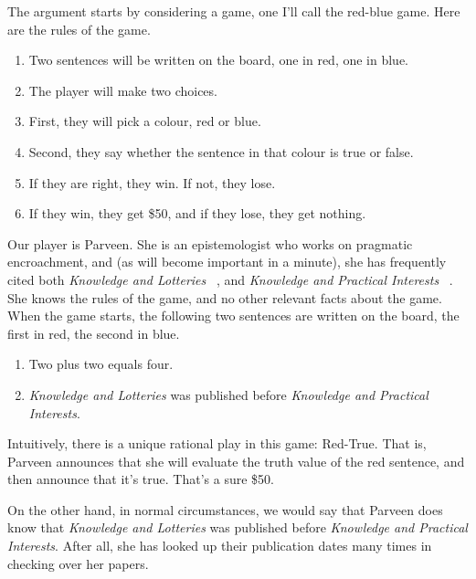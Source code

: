 The argument starts by considering a game, one I'll call the red-blue game. Here are the rules of the game.

\begin{enumerate}
\item Two sentences will be written on the board, one in red, one in blue.

\item The player will make two choices.

\item First, they will pick a colour, red or blue.

\item Second, they say whether the sentence in that colour is true or false.

\item If they are right, they win. If not, they lose.

\item If they win, they get \$50, and if they lose, they get nothing.

\end{enumerate}
Our player is Parveen. She is an epistemologist who works on pragmatic encroachment, and (as will become important in a minute), she has frequently cited both \emph{Knowledge and Lotteries} ~\citep{Hawthorne2004}, and \emph{Knowledge and Practical Interests} ~\citep{Stanley2005}. She knows the rules of the game, and no other relevant facts about the game. When the game starts, the following two sentences are written on the board, the first in red, the second in blue.

\begin{enumerate}
\item Two plus two equals four.

\item \emph{Knowledge and Lotteries} was published before \emph{Knowledge and Practical Interests}.

\end{enumerate}
Intuitively, there is a unique rational play in this game: Red-True. That is, Parveen announces that she will evaluate the truth value of the red sentence, and then announce that it's true. That's a sure \$50.

On the other hand, in normal circumstances, we would say that Parveen does know that \emph{Knowledge and Lotteries} was published before \emph{Knowledge and Practical Interests}. After all, she has looked up their publication dates many times in checking over her papers. 

